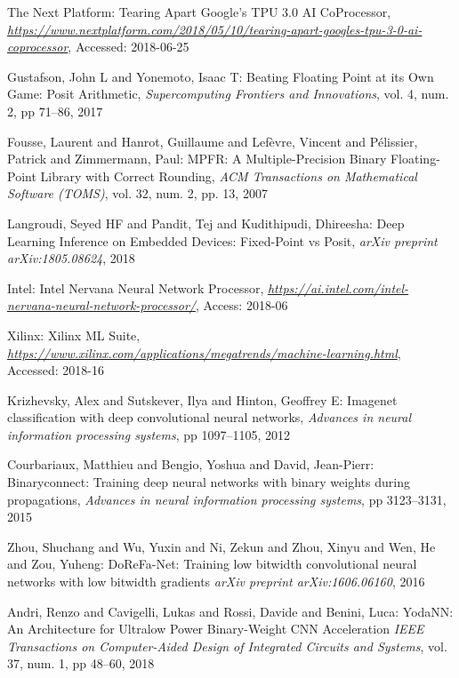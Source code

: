 \documentclass[techrep,english]{ipsj} %
\begin{document}
\begin{thebibliography}{99}
  The Next Platform:
  Tearing Apart Google’s TPU 3.0 AI CoProcessor,
  {\it \url{https://www.nextplatform.com/2018/05/10/tearing-apart-googles-tpu-3-0-ai-coprocessor}},
  Accessed: 2018-06-25
    
  Gustafson, John L and Yonemoto, Isaac T:
  Beating Floating Point at its Own Game: Posit Arithmetic,
  {\it Supercomputing Frontiers and Innovations},
  vol. 4, num. 2, pp 71--86, 2017

  Fousse, Laurent and Hanrot, Guillaume and Lef{\`e}vre, Vincent and P{\'e}lissier, Patrick and Zimmermann, Paul:
  MPFR: A Multiple-Precision Binary Floating-Point Library with Correct Rounding,
  {\it ACM Transactions on Mathematical Software (TOMS)},
  vol. 32, num. 2, pp. 13, 2007


  Langroudi, Seyed HF and Pandit, Tej and Kudithipudi, Dhireesha:
  Deep Learning Inference on Embedded Devices: Fixed-Point vs Posit,
  {\it arXiv preprint arXiv:1805.08624},
  2018

  Intel:
  Intel Nervana Neural Network Processor,
  {\it \url{https://ai.intel.com/intel-nervana-neural-network-processor/}},
  Access: 2018-06

  Xilinx:
  Xilinx ML Suite,
  {\it \url{https://www.xilinx.com/applications/megatrends/machine-learning.html}},
  Accessed: 2018-16

  Krizhevsky, Alex and Sutskever, Ilya and Hinton, Geoffrey E:
  Imagenet classification with deep convolutional neural networks,
  {\it Advances in neural information processing systems},
  pp 1097–1105, 2012

  Courbariaux, Matthieu and Bengio, Yoshua and David, Jean-Pierr:
  Binaryconnect: Training deep neural networks with binary weights during propagations,
  {\it Advances in neural information processing systems},
  pp 3123–3131, 2015

  Zhou, Shuchang and Wu, Yuxin and Ni, Zekun and Zhou, Xinyu and Wen, He and Zou, Yuheng:
  DoReFa-Net: Training low bitwidth convolutional neural networks with low bitwidth gradients
  {\it  arXiv preprint arXiv:1606.06160},
  2016

  Andri, Renzo and Cavigelli, Lukas and Rossi, Davide and Benini, Luca:
  YodaNN: An Architecture for Ultralow Power Binary-Weight CNN Acceleration
  {\it IEEE Transactions on Computer-Aided Design of Integrated Circuits and Systems},
  vol. 37, num. 1, pp 48–60, 2018


\end{thebibliography}
\end{document}
